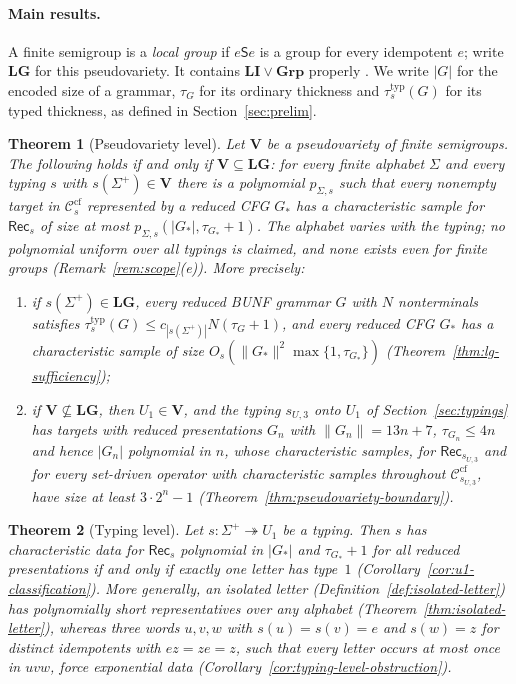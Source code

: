 \documentclass[11pt]{article}
\numberwithin{equation}{section}
\theoremstyle{plain}
\theoremstyle{definition}
\theoremstyle{remark}
\theoremstyle{plain}
\newtheorem{mainthm}{Theorem}
\newcommand{\cf}{\mathrm{cf}}
\newcommand{\Ccf}[1]{\mathcal C_{#1}^{\cf}}
\newcommand{\Rec}{\mathsf{Rec}}
\newcommand{\LG}{\mathbf{LG}}
\begin{document}
\paragraph{Main results.}
A finite semigroup is a \emph{local group} if $e\mathsf Se$ is a group for every
idempotent $e$; write $\LG$ for this pseudovariety.  It contains
$\mathbf{LI}\vee\mathbf{Grp}$ properly \cite{CostaNogueiraTeixeira2021}.
We write $|G|$ for the encoded size of a grammar, $\tau_G$ for its ordinary
thickness and $\tau^{\mathrm{typ}}_s(G)$ for its typed thickness, as defined
in Section~\ref{sec:prelim}.

\begin{mainthm}[Pseudovariety level]
\label{thm:A}
Let $\mathbf V$ be a pseudovariety of finite semigroups.  The following holds
if and only if $\mathbf V\subseteq\LG$: for every finite alphabet $\Sigma$ and
every typing $s$ with $s(\Sigma^+)\in\mathbf V$ there is a polynomial
$p_{\Sigma,s}$ such that every nonempty target in $\Ccf{s}$ represented by a
reduced CFG $G_*$ has a characteristic sample for $\Rec_s$ of size at most
$p_{\Sigma,s}(|G_*|,\tau_{G_*}+1)$.  The alphabet varies with the typing; no
polynomial uniform over all typings is claimed, and none exists even for
finite groups \textup(Remark~\ref{rem:scope}(e)\textup).
More precisely:
\begin{enumerate}[label=\textup{(\roman*)},leftmargin=*]
\item if $s(\Sigma^+)\in\LG$, every reduced BUNF grammar $G$ with $N$
nonterminals satisfies $\tau^{\mathrm{typ}}_s(G)\le c_{|s(\Sigma^+)|}N(\tau_G+1)$, and every
reduced CFG $G_*$ has a characteristic sample of size
$O_s(\|G_*\|^2\max\{1,\tau_{G_*}\})$
\textup(Theorem~\ref{thm:lg-sufficiency}\textup);
\item if $\mathbf V\not\subseteq\LG$, then $U_1\in\mathbf V$, and the typing
$s_{U,3}$ onto $U_1$ of Section~\ref{sec:typings} has targets with reduced
presentations $G_n$ with $\|G_n\|=13n+7$, $\tau_{G_n}\le4n$ and hence
$|G_n|$ polynomial in $n$, whose characteristic samples, for $\Rec_{s_{U,3}}$
and for every set-driven operator with characteristic samples throughout
$\Ccf{s_{U,3}}$, have size at least $3\cdot2^n-1$
\textup(Theorem~\ref{thm:pseudovariety-boundary}\textup).
\end{enumerate}
\end{mainthm}

\begin{mainthm}[Typing level]
\label{thm:B}
Let $s:\Sigma^+\twoheadrightarrow U_1$ be a typing.  Then $s$ has
characteristic data for $\Rec_s$ polynomial in $|G_*|$ and $\tau_{G_*}+1$
for all reduced presentations if and only if exactly one letter has type~$1$
\textup(Corollary~\ref{cor:u1-classification}\textup).  More generally, an
isolated letter \textup(Definition~\ref{def:isolated-letter}\textup) has
polynomially short representatives over any alphabet
\textup(Theorem~\ref{thm:isolated-letter}\textup), whereas three words $u,v,w$ with $s(u)=s(v)=e$ and $s(w)=z$ for
distinct idempotents with $ez=ze=z$, such that every letter occurs at most once
in $uvw$, force exponential data
\textup(Corollary~\ref{cor:typing-level-obstruction}\textup).
\end{mainthm}
\end{document}
